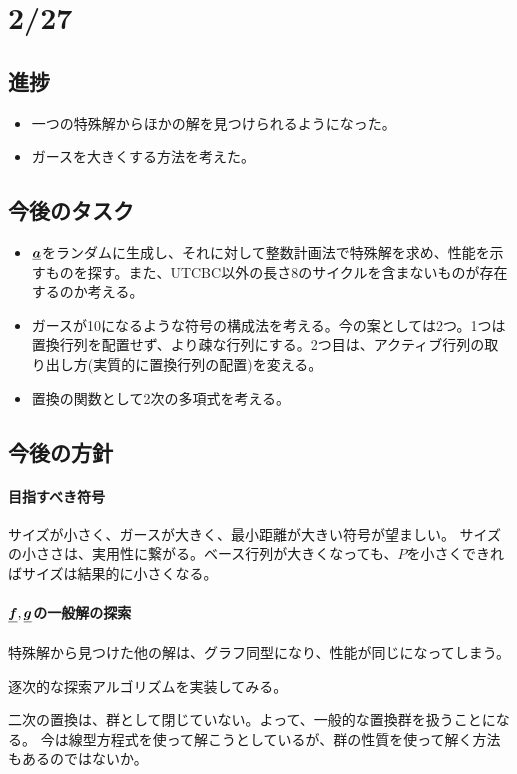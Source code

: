 \documentclass[a4paper,11pt,dvipdfmx]{jsarticle}
\theoremstyle{definition}
\begin{document}
\section{2/27}
\subsection{進捗}
\begin{itemize}
  \item 一つの特殊解からほかの解を見つけられるようになった。
  \item ガースを大きくする方法を考えた。
\end{itemize}


\subsection{今後のタスク}
\begin{itemize}
  \item $\underline{\bm{a}}$をランダムに生成し、それに対して整数計画法で特殊解を求め、性能を示すものを探す。また、UTCBC以外の長さ8のサイクルを含まないものが存在するのか考える。
  \item ガースが10になるような符号の構成法を考える。今の案としては2つ。1つは置換行列を配置せず、より疎な行列にする。2つ目は、アクティブ行列の取り出し方(実質的に置換行列の配置)を変える。
  \item 置換の関数として2次の多項式を考える。
\end{itemize}

\subsection{今後の方針}
\paragraph{目指すべき符号}
サイズが小さく、ガースが大きく、最小距離が大きい符号が望ましい。
サイズの小ささは、実用性に繋がる。ベース行列が大きくなっても、$P$を小さくできればサイズは結果的に小さくなる。
\paragraph{$\underline{\bm{f}},\underline{\bm{g}}$の一般解の探索}
特殊解から見つけた他の解は、グラフ同型になり、性能が同じになってしまう。

逐次的な探索アルゴリズムを実装してみる。

二次の置換は、群として閉じていない。よって、一般的な置換群を扱うことになる。
今は線型方程式を使って解こうとしているが、群の性質を使って解く方法もあるのではないか。
\end{document}
